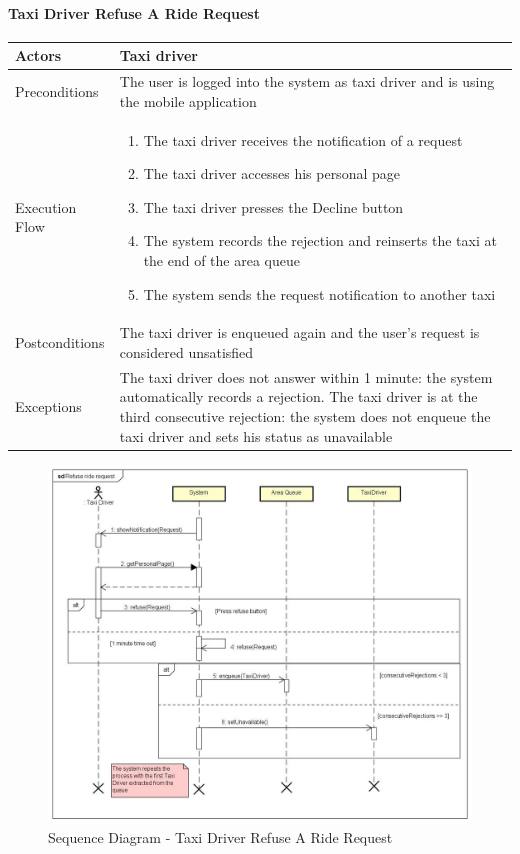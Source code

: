 \paragraph{Taxi Driver Refuse A Ride Request}
\begin{center}
	\begin{tabular}{ | l | p{8cm} |}
		\hline Actors & Taxi driver
		\\ \hline
		Preconditions &
		The user is logged into the system as taxi driver and is using the mobile application
		\\ \hline
		Execution Flow &
		\begin{enumerate}
			\item The taxi driver receives the notification of a request
			\item The taxi driver accesses his personal page
			\item The taxi driver presses the Decline button
			\item The system records the rejection and reinserts the taxi at the end of
			the area queue
			\item The system sends the request notification to another taxi
		\end{enumerate}
		\\ \hline
		Postconditions & The taxi driver is enqueued again and the user's request
		is considered unsatisfied
		\\ \hline
		Exceptions &
		The taxi driver does not answer within 1 minute:
		the system automatically records a rejection.
		The taxi driver is at the third consecutive rejection:
		the system does not enqueue the taxi driver and sets his status as unavailable
		\\ \hline
	\end{tabular}
\end{center}
\newpage
\begin{landscape}
\begin{figure}[!h]
	\begin{center}			
		\includegraphics[height=\textheight]{../SE2_SD/RefuseRideRequest}
		\caption{Sequence Diagram - Taxi Driver Refuse A Ride Request}	
	\end{center}
\end{figure}
\end{landscape}
\newpage

